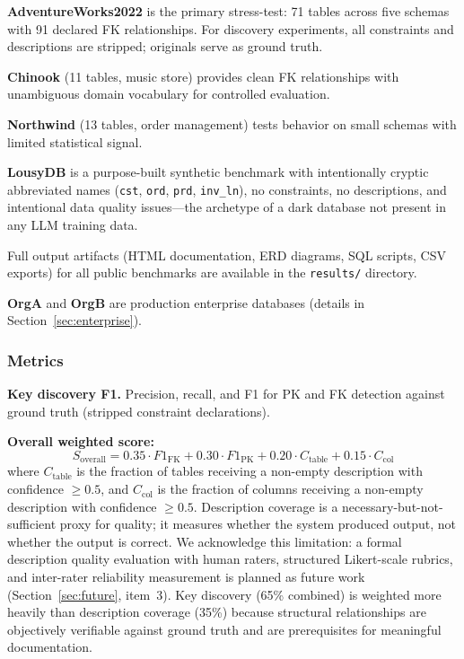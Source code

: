 \documentclass[sigconf, nonacm]{acmart}
\begin{document}
\textbf{AdventureWorks2022} is the primary stress-test: 71 tables across five schemas with 91 declared FK relationships. For discovery experiments, all constraints and descriptions are stripped; originals serve as ground truth.

\textbf{Chinook} (11 tables, music store) provides clean FK relationships with unambiguous domain vocabulary for controlled evaluation.

\textbf{Northwind} (13 tables, order management) tests behavior on small schemas with limited statistical signal.

\textbf{LousyDB} is a purpose-built synthetic benchmark with intentionally cryptic abbreviated names (\texttt{cst}, \texttt{ord}, \texttt{prd}, \texttt{inv\_ln}), no constraints, no descriptions, and intentional data quality issues---the archetype of a dark database not present in any LLM training data.

Full output artifacts (HTML documentation, ERD diagrams, SQL scripts, CSV exports) for all public benchmarks are available in the \texttt{results/} directory.

\textbf{OrgA} and \textbf{OrgB} are production enterprise databases (details in Section~\ref{sec:enterprise}).

\subsubsection{Metrics}

\textbf{Key discovery F1.} Precision, recall, and F1 for PK and FK detection against ground truth (stripped constraint declarations).

\textbf{Overall weighted score:}
\begin{equation}
S_{\text{overall}} = 0.35 \cdot F1_{\text{FK}} + 0.30 \cdot F1_{\text{PK}} + 0.20 \cdot C_{\text{table}} + 0.15 \cdot C_{\text{col}}
\end{equation}
where $C_{\text{table}}$ is the fraction of tables receiving a non-empty description with confidence $\geq 0.5$, and $C_{\text{col}}$ is the fraction of columns receiving a non-empty description with confidence $\geq 0.5$. Description coverage is a necessary-but-not-sufficient proxy for quality; it measures whether the system produced output, not whether the output is correct. We acknowledge this limitation: a formal description quality evaluation with human raters, structured Likert-scale rubrics, and inter-rater reliability measurement is planned as future work (Section~\ref{sec:future}, item~3). Key discovery (65\% combined) is weighted more heavily than description coverage (35\%) because structural relationships are objectively verifiable against ground truth and are prerequisites for meaningful documentation.
\end{document}
